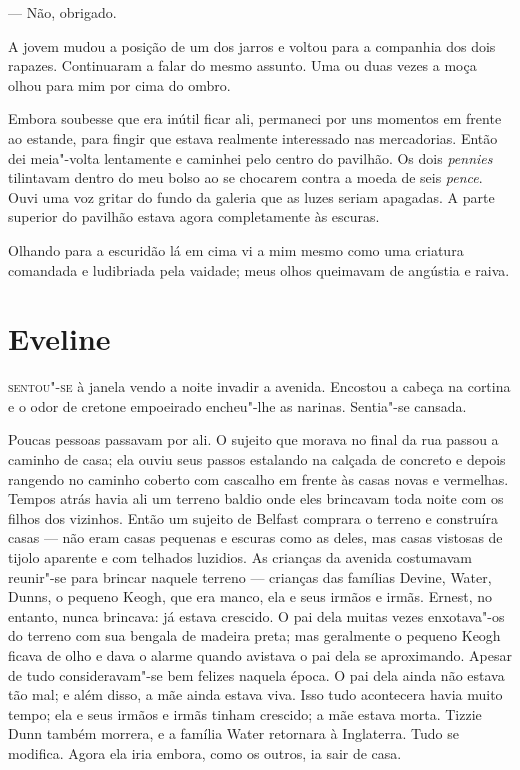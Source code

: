 --- Não, obrigado.

A jovem mudou a posição de um dos jarros e voltou para a companhia dos dois
rapazes.  Continuaram a falar do mesmo assunto.  Uma ou duas vezes a moça olhou
para mim por cima do ombro.

Embora soubesse que era inútil ficar ali, permaneci por uns momentos em frente
ao estande, para fingir que estava realmente interessado nas mercadorias.
Então dei meia"-volta lentamente e caminhei pelo centro do pavilhão.  Os dois
\textit{pennies} tilintavam dentro do meu bolso ao se chocarem contra a moeda
de seis \textit{pence}.  Ouvi uma voz gritar do fundo da galeria que as luzes
seriam apagadas.  A parte superior do pavilhão estava agora completamente às
escuras.

Olhando para a escuridão lá em cima vi a mim mesmo como uma criatura comandada
e ludibriada pela vaidade; meus olhos queimavam de angústia e raiva.


\chapter{Eveline}

\textsc{sentou"-se} à janela vendo a noite invadir a avenida.  Encostou a cabeça
na cortina e o odor de cretone empoeirado encheu"-lhe as narinas.  Sentia"-se
cansada.

Poucas pessoas passavam por ali.  O sujeito que morava no final da rua passou a
caminho de casa; ela ouviu seus passos estalando na calçada de concreto e
depois rangendo no caminho coberto com cascalho em frente às casas novas e
vermelhas.  Tempos atrás havia ali um terreno baldio onde eles brincavam toda
noite com os filhos dos vizinhos.  Então um sujeito de Belfast comprara o
terreno e construíra casas --- não eram casas pequenas e escuras como as deles,
mas casas vistosas de tijolo aparente e com telhados luzidios.  As crianças da
avenida costumavam reunir"-se para brincar naquele terreno --- crianças das
famílias Devine, Water, Dunns, o pequeno Keogh, que era manco, ela e seus
irmãos e irmãs.  Ernest, no entanto, nunca brincava: já estava crescido.  O pai
dela muitas vezes enxotava"-os do terreno com sua bengala de madeira preta; mas
geralmente o pequeno Keogh ficava de olho e dava o alarme quando avistava o pai
dela se aproximando.  Apesar de tudo consideravam"-se bem felizes naquela época.
O pai dela ainda não estava tão mal; e além disso, a mãe ainda estava viva.
Isso tudo acontecera havia muito tempo; ela e seus irmãos e irmãs tinham
crescido; a mãe estava morta.  Tizzie Dunn também morrera, e a família Water
retornara à Inglaterra.  Tudo se modifica.  Agora ela iria embora, como os
outros, ia sair de casa.

